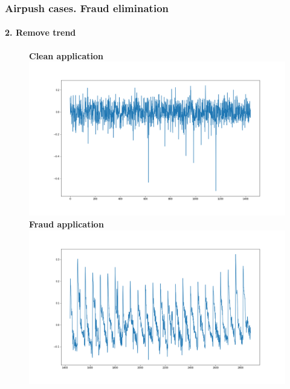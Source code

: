 \documentclass[intlimits, 9pt, unicode]{beamer}
\begin{document}
\begin{frame}
    \frametitle{Airpush cases. Fraud elimination}
    \framesubtitle{2. Remove trend}
    \begin{figure}
	\textbf{Clean application}
	\includegraphics[scale=0.10]{images/011_case_1}
	\textbf{Fraud application}
	\includegraphics[scale=0.10]{images/012_case_1}
     \end{figure}
\end{frame}
\end{document}
